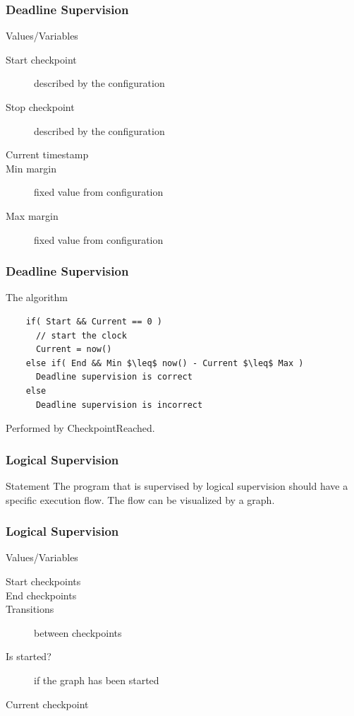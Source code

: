 \documentclass{beamer}
\begin{document}
\begin{frame}
  \frametitle{Deadline Supervision}
  \begin{block}{Values/Variables}
    \begin{description}
      \item[Start checkpoint] described by the configuration
      \item[Stop checkpoint] described by the configuration
      \item[Current timestamp]
      \item[Min margin] fixed value from configuration
      \item[Max margin] fixed value from configuration
    \end{description}
  \end{block}
\end{frame}

\begin{frame}[fragile]
  \frametitle{Deadline Supervision}
  \begin{block}{The algorithm}
    \begin{lstlisting}
    if( Start && Current == 0 )
      // start the clock
      Current = now()
    else if( End && Min $\leq$ now() - Current $\leq$ Max )
      Deadline supervision is correct
    else
      Deadline supervision is incorrect
    \end{lstlisting}
  \end{block}
  Performed by CheckpointReached.
\end{frame}

\begin{frame}
  \frametitle{Logical Supervision}
  \begin{block}{Statement}
    The program that is supervised by logical supervision should have
    a specific execution flow. The flow can be visualized by a
    graph.
  \end{block}
\end{frame}

\begin{frame}
  \frametitle{Logical Supervision}
  \begin{block}{Values/Variables}
    \begin{description}
      \item[Start checkpoints]
      \item[End checkpoints]
      \item[Transitions] between checkpoints
      \item[Is started?] if the graph has been started
      \item[Current checkpoint]
    \end{description}
  \end{block}
\end{frame}
\end{document}
